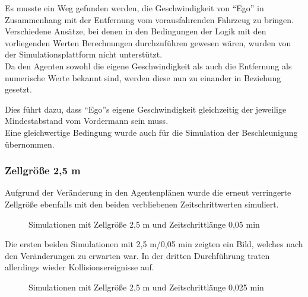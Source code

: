 Es musste ein Weg gefunden werden, die Geschwindigkeit von \enquote{Ego} in Zusammenhang mit der Entfernung vom vorausfahrenden Fahrzeug zu bringen.
\\
Verschiedene Ansätze, bei denen in den Bedingungen der Logik mit den vorliegenden Werten Berechnungen durchzuführen gewesen wären, wurden von der Simulationsplattform nicht unterstützt.
\\
Da den Agenten sowohl die eigene Geschwindigkeit als auch die Entfernung als numerische Werte bekannt sind, werden diese nun zu einander in Beziehung gesetzt.

Dies führt dazu, dass \enquote{Ego}s eigene Geschwindigkeit gleichzeitig der jeweilige Mindestabstand vom Vordermann sein muss. 
\\
Eine gleichwertige Bedingung wurde auch für die Simulation der Beschleunigung übernommen.

\subsubsection{Zellgröße 2,5 m}

Aufgrund der Veränderung in den Agentenplänen wurde die erneut verringerte Zellgröße ebenfalls mit den beiden verbliebenen Zeitschrittwerten simuliert.

\begin{figure}[hptb]
  \centering 
   \qquad 
   \qquad 
  \caption{Simulationen mit Zellgröße 2,5 m und Zeitschrittlänge 0,05 min} 
  \label{figure:run24-26}
\end{figure}

Die ersten beiden Simulationen mit 2,5 m/0,05 min zeigten ein Bild, welches nach den Veränderungen zu erwarten war.
In der dritten Durchführung traten allerdings wieder Kollisionsereignisse auf.

\begin{figure}[hptb]
  \centering 
   \qquad 
   \qquad 
  \caption{Simulationen mit Zellgröße 2,5 m und Zeitschrittlänge 0,025 min} 
  \label{figure:run27-29}
\end{figure}

